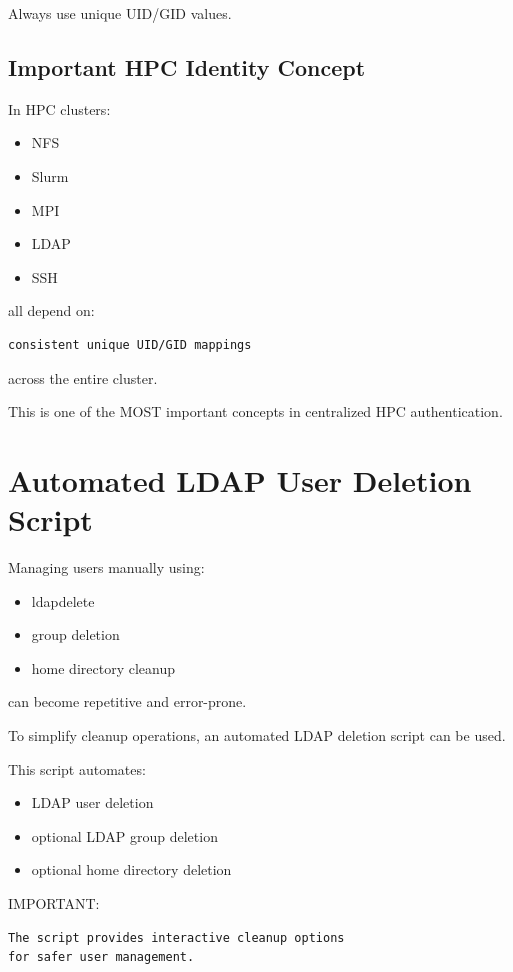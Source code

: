 \documentclass[11pt]{article}
\begin{document}
Always use unique UID/GID values.
\subsection{Important HPC Identity Concept}
\label{sec:org0078b44}

In HPC clusters:

\begin{itemize}
\item NFS
\item Slurm
\item MPI
\item LDAP
\item SSH
\end{itemize}

all depend on:

\begin{verbatim}
consistent unique UID/GID mappings
\end{verbatim}

across the entire cluster.

This is one of the MOST important concepts in centralized HPC authentication.
\section{Automated LDAP User Deletion Script}
\label{sec:orgcea540f}

Managing users manually using:

\begin{itemize}
\item ldapdelete
\item group deletion
\item home directory cleanup
\end{itemize}

can become repetitive and error-prone.

To simplify cleanup operations, an automated LDAP deletion script can be used.

This script automates:

\begin{itemize}
\item LDAP user deletion
\item optional LDAP group deletion
\item optional home directory deletion
\end{itemize}

IMPORTANT:

\begin{verbatim}
The script provides interactive cleanup options
for safer user management.
\end{verbatim}
\end{document}
